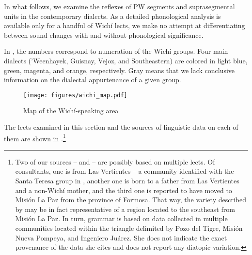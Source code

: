 In what follows, we examine the reflexes of PW segments and suprasegmental units in the contemporary dialects. As a detailed phonological analysis is available only for a handful of Wichí lects, we make no attempt at differentiating between sound changes with and without phonological significance.

In , the numbers correspond to  numeration of the Wichí groups. Four main dialects (’Weenhayek, Guisnay, Vejoz, and Southeastern) are colored in light blue, green, magenta, and orange, respectively. Gray means that we lack conclusive information on the dialectal appurtenance of a given group.

\begin{figure}
\texttt{[image: figures/wichi\_map.pdf]}
\caption{Map of the Wichí-speaking area}
\label{fig-wi-map}
\end{figure}

The lects examined in this section and the sources of linguistic data on each of them are shown in .\footnote{Two of our sources – \citet{MA08} and \citet{VN14} – are possibly based on multiple lects. Of  consultants, one is from Las Vertientes -- a community identified with the Santa Teresa group in \citet[3]{JB09}, another one is born to a father from Las Vertientes and a non-Wichí mother, and the third one is reported to have moved to Misión La Paz from the province of Formosa. That way, the variety described by \citet{MA08} may be in fact representative of a region located to the southeast from Misión La Paz. In turn,  grammar is based on data collected in multiple communities located within the triangle delimited by Pozo del Tigre, Misión Nueva Pompeya, and Ingeniero Juárez. She does not indicate the exact provenance of the data she cites and does not report any diatopic variation.}

